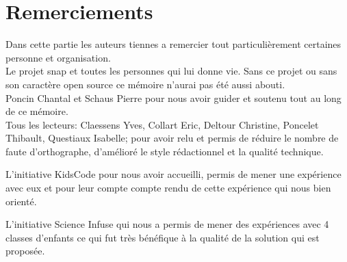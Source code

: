 \section*{Remerciements}
Dans cette partie les auteurs tiennes a remercier tout particulièrement certaines personne et organisation.\\

Le projet \gls{snap} et toutes les personnes qui lui donne vie. Sans ce projet ou sans son caractère open source ce mémoire n'aurai pas été aussi abouti.\\

Poncin Chantal et Schaus Pierre pour nous avoir guider et soutenu tout au long de ce mémoire.\\

Tous les lecteurs: Claessens Yves, Collart Eric, Deltour Christine, Poncelet Thibault, Questiaux Isabelle; pour avoir relu et permis de réduire le nombre de faute d'orthographe, d'amélioré le style rédactionnel et la qualité technique.

L'initiative KidsCode pour nous avoir accueilli, permis de mener une expérience avec eux et pour leur compte compte rendu de cette expérience qui nous bien orienté.

L'initiative Science Infuse qui nous a permis de mener des expériences avec 4 classes d'enfants ce qui fut très bénéfique à la qualité de la solution qui est proposée.
